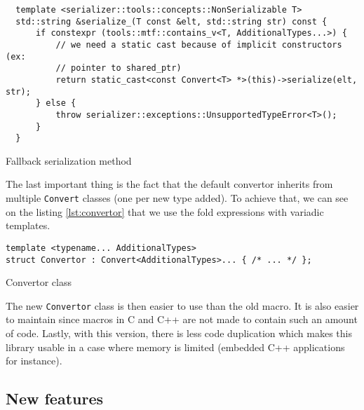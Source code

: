 \begin{listing}[ht!]
\begin{verbatim}
  template <serializer::tools::concepts::NonSerializable T>
  std::string &serialize_(T const &elt, std::string str) const {
      if constexpr (tools::mtf::contains_v<T, AdditionalTypes...>) {
          // we need a static cast because of implicit constructors (ex:
          // pointer to shared_ptr)
          return static_cast<const Convert<T> *>(this)->serialize(elt, str);
      } else {
          throw serializer::exceptions::UnsupportedTypeError<T>();
      }
  }
\end{verbatim}
\caption{Fallback serialization method}
\label{lstd:fallbackserialize}
\end{listing}

The last important thing is the fact that the default convertor inherits from
multiple \texttt{Convert} classes (one per new type added). To achieve that, we
can see on the listing \ref{lst:convertor} that we use the fold expressions with
variadic templates.

\begin{listing}[ht!]
\begin{verbatim}
template <typename... AdditionalTypes>
struct Convertor : Convert<AdditionalTypes>... { /* ... */ };
\end{verbatim}
\caption{Convertor class}
\label{lst:convertor}
\end{listing}

The new \texttt{Convertor} class is then easier to use than the old macro. It
is also easier to maintain since macros in C and C++ are not made to contain
such an amount of code. Lastly, with this version, there is less code
duplication which makes this library usable in a case where memory is limited
(embedded C++ applications for instance).

\subsection{New features}

